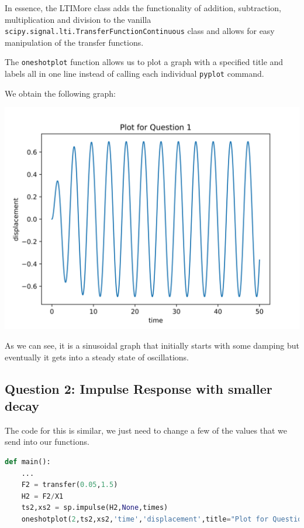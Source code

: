 \documentclass[12pt]{article}
\begin{document}
In essence, the LTIMore class adds the functionality of addition, subtraction, multiplication and division to the vanilla \texttt{scipy.signal.lti.TransferFunctionContinuous} class and allows for easy manipulation of the transfer functions.

The \texttt{oneshotplot} function allows us to plot a graph with a specified title and labels all in one line instead of calling each individual \texttt{pyplot} command.

\pagebreak
We obtain the following graph:

\begin{center}
    \includegraphics[scale=1]{images/fig1.png}
\end{center}

As we can see, it is a sinusoidal graph that initially starts with some damping but eventually it gets into a steady state of oscillations.
\pagebreak
\subsection{Question 2: Impulse Response with smaller decay}

The code for this is similar, we just need to change a few of the values that we send into our functions.

\begin{lstlisting}[language=Python]
def main():
    ...
    F2 = transfer(0.05,1.5)
    H2 = F2/X1
    ts2,xs2 = sp.impulse(H2,None,times)
    oneshotplot(2,ts2,xs2,'time','displacement',title="Plot for Question 2")
\end{lstlisting}
\end{document}
